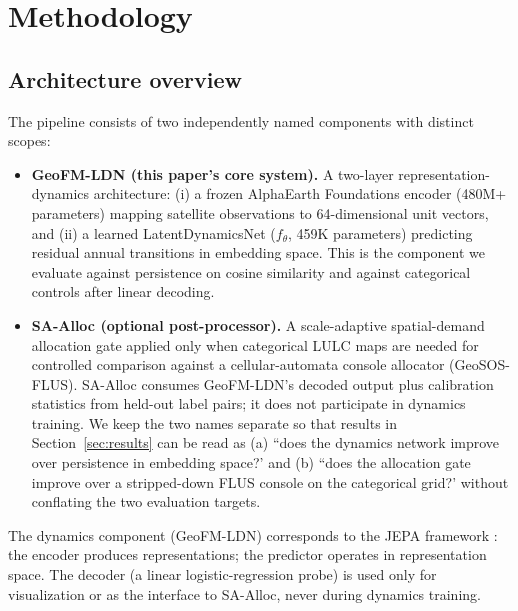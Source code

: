 \documentclass{article}
\begin{document}
\section{Methodology}
\label{sec:method}

\subsection{Architecture overview}

The pipeline consists of two independently named components with distinct scopes:

\begin{itemize}
\item \textbf{GeoFM-LDN (this paper's core system).} A two-layer representation-dynamics architecture: (i) a frozen AlphaEarth Foundations encoder (480M+ parameters) mapping satellite observations to 64-dimensional unit vectors, and (ii) a learned LatentDynamicsNet ($f_\theta$, 459K parameters) predicting residual annual transitions in embedding space. This is the component we evaluate against persistence on cosine similarity and against categorical controls after linear decoding.
\item \textbf{SA-Alloc (optional post-processor).} A scale-adaptive spatial-demand allocation gate applied only when categorical LULC maps are needed for controlled comparison against a cellular-automata console allocator (GeoSOS-FLUS). SA-Alloc consumes GeoFM-LDN's decoded output plus calibration statistics from held-out label pairs; it does not participate in dynamics training. We keep the two names separate so that results in Section~\ref{sec:results} can be read as (a) ``does the dynamics network improve over persistence in embedding space?' and (b) ``does the allocation gate improve over a stripped-down FLUS console on the categorical grid?' without conflating the two evaluation targets.
\end{itemize}

The dynamics component (GeoFM-LDN) corresponds to the JEPA framework \citep{lecun2022jepa}: the encoder produces representations; the predictor operates in representation space. The decoder (a linear logistic-regression probe) is used only for visualization or as the interface to SA-Alloc, never during dynamics training.
\end{document}
